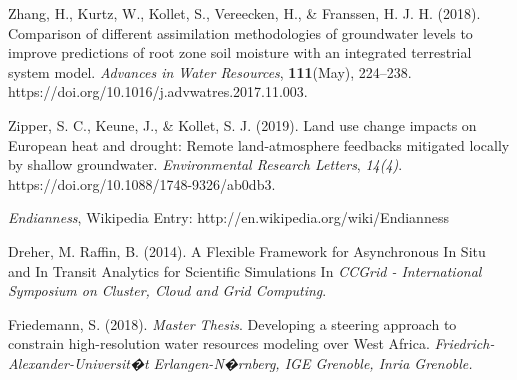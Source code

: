 \begin{thebibliography}{999}
Zhang, H., Kurtz, W., Kollet, S., Vereecken, H., \& Franssen, H. J. H. (2018). Comparison of different assimilation methodologies of groundwater levels to improve predictions of root zone soil moisture with an integrated terrestrial system model. {\em Advances in Water Resources}, {\bf 111}(May), 224–238. https://doi.org/10.1016/j.advwatres.2017.11.003.


Zipper, S. C., Keune, J., \& Kollet, S. J. (2019). Land use change impacts on European heat and drought: Remote land-atmosphere feedbacks mitigated locally by shallow groundwater. {\em Environmental Research Letters}, {\em 14(4)}. https://doi.org/10.1088/1748-9326/ab0db3.

{\em Endianness}, Wikipedia Entry: http://en.wikipedia.org/wiki/Endianness


  Dreher, M. Raffin, B. (2014). A Flexible Framework for Asynchronous In Situ and In Transit Analytics for Scientific Simulations
  \newblock In {\em CCGrid - International Symposium on Cluster, Cloud and Grid Computing}.

  Friedemann, S. (2018). {\em Master Thesis}. Developing a steering approach to constrain high-resolution water resources modeling over West Africa.
  {\em Friedrich-Alexander-Universit�t Erlangen-N�rnberg, IGE Grenoble, Inria Grenoble.}
\end{thebibliography}
